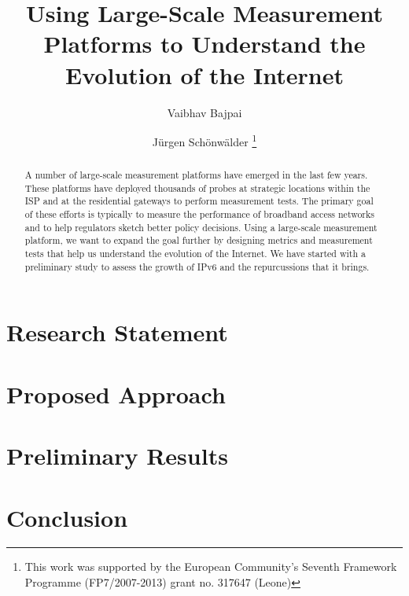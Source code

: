 \documentclass[a4paper]{llncs}
\begin{document}
\mainmatter  %

\title{Using Large-Scale Measurement Platforms to Understand the Evolution of
the Internet}

\author{Vaibhav Bajpai \and Jürgen Schönwälder%
\thanks{This work was supported by the European Community’s Seventh Framework
Programme (FP7/2007-2013) grant no. 317647 (Leone)}}
\maketitle

\begin{abstract}

A number of large-scale measurement platforms have emerged in the last few
years. These platforms have deployed thousands of probes at strategic
locations within the \ac{ISP} and at the residential gateways to perform
measurement tests. The primary goal of these efforts is typically to measure
the performance of broadband access networks and to help regulators sketch
better policy decisions. Using a large-scale measurement platform, we want to
expand the goal further by designing metrics and measurement tests that help
us understand the evolution of the Internet.  We have started with a
preliminary study to assess the growth of IPv6 and the repurcussions that it
brings.

\end{abstract}


\section{Research Statement}
\label{sec:rstatement}
\section{Proposed Approach}
\label{sec:approach}
\section{Preliminary Results}
\label{sec:preliminaryresults}
\section{Conclusion}
\label{sec:conclusion}





\end{document}
